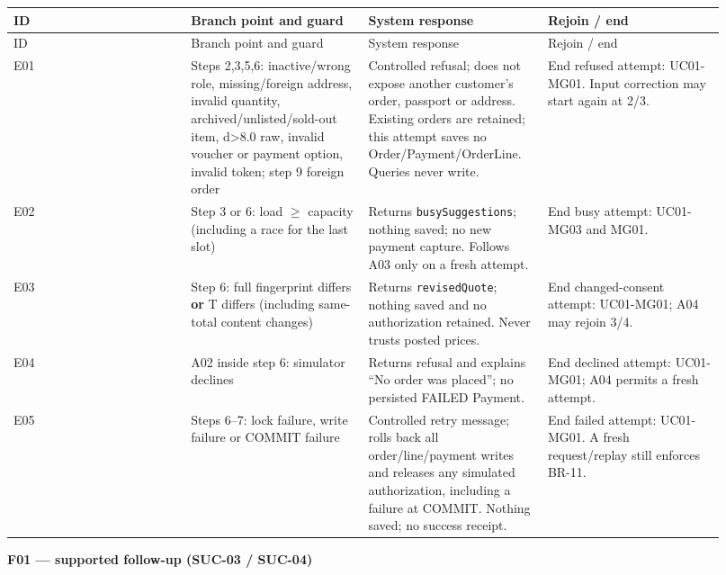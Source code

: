 \begin{longtable}{>{\raggedright\arraybackslash}p{0.2300\linewidth}>{\raggedright\arraybackslash}p{0.2300\linewidth}>{\raggedright\arraybackslash}p{0.2300\linewidth}>{\raggedright\arraybackslash}p{0.2300\linewidth}}
ID & Branch point and guard & System response & Rejoin / end \\
\hline\endfirsthead
ID & Branch point and guard & System response & Rejoin / end \\
\hline\endhead
E01 & Steps 2,3,5,6: inactive/wrong role, missing/foreign address, invalid quantity, archived/unlisted/sold-out item, d\textgreater{}8.0 raw, invalid voucher or payment option, invalid token; step 9 foreign order & Controlled refusal; does not expose another customer's order, passport or address. Existing orders are retained; this attempt saves no Order/Payment/OrderLine. Queries never write. & End refused attempt: UC01-MG01. Input correction may start again at 2/3. \\
E02 & Step 3 or 6: load \ensuremath{\geq} capacity (including a race for the last slot) & Returns \texttt{busySuggestions}; nothing saved; no new payment capture. Follows A03 only on a fresh attempt. & End busy attempt: UC01-MG03 and MG01. \\
E03 & Step 6: full fingerprint differs \textbf{or} T differs (including same-total content changes) & Returns \texttt{revisedQuote}; nothing saved and no authorization retained. Never trusts posted prices. & End changed-consent attempt: UC01-MG01; A04 may rejoin 3/4. \\
E04 & A02 inside step 6: simulator declines & Returns refusal and explains ``No order was placed''; no persisted FAILED Payment. & End declined attempt: UC01-MG01; A04 permits a fresh attempt. \\
E05 & Steps 6--7: lock failure, write failure or COMMIT failure & Controlled retry message; rolls back all order/line/payment writes and releases any simulated authorization, including a failure at COMMIT. Nothing saved; no success receipt. & End failed attempt: UC01-MG01. A fresh request/replay still enforces BR-11. \\
\end{longtable}
\textbf{F01 --- supported follow-up (SUC-03 / SUC-04)}

